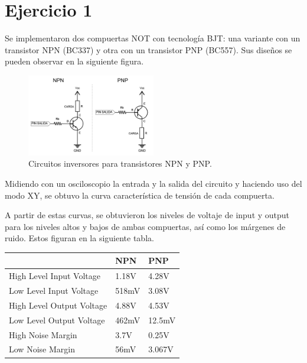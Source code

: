 \part*{Ejercicio 1}


Se implementaron dos compuertas NOT con tecnología BJT: una variante con un transistor NPN (BC337) y otra con un transistor PNP (BC557). Sus diseños se pueden observar en la siguiente figura.


\begin{figure}[H]
  \centering
    \includegraphics[width=0.5\textwidth]{ejercicio1/circuitos.png}
    \caption{Circuitos inversores para transistores NPN y PNP.}
\end{figure}

Midiendo con un osciloscopio la entrada y la salida del circuito y haciendo uso del modo XY, se obtuvo la curva caracter\'istica de tensi\'on de cada compuerta.

A partir de estas curvas, se obtuvieron los niveles de voltaje de input y output para los niveles altos y bajos de ambas compuertas, as\'i como los m\'argenes de ruido. Estos figuran en la siguiente tabla.

\begin{table}[H]
\centering
\begin{tabular}{|l|l|l|}
\hline
                          & NPN   & PNP    \\
\hline
High Level Input Voltage  & 1.18V & 4.28V  \\
Low Level Input Voltage   & 518mV & 3.08V  \\
High Level Output Voltage & 4.88V & 4.53V  \\
Low Level Output Voltage  & 462mV & 12.5mV \\
High Noise Margin         & 3.7V  & 0.25V  \\
Low Noise Margin          & 56mV  & 3.067V \\
\hline	
\end{tabular}
\end{table}


